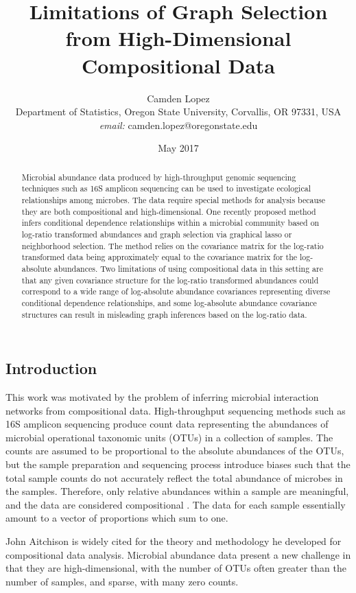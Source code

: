 \documentclass[10pt]{article}
\title{Limitations of Graph Selection from High-Dimensional Compositional Data}
\author{Camden Lopez \\
\small{Department of Statistics, Oregon State University, Corvallis, OR 97331, USA} \\
\small{\textit{email:} camden.lopez@oregonstate.edu}}
\date{May 2017}
\begin{document}
\maketitle

\begin{abstract}
Microbial abundance data produced by high-throughput genomic sequencing techniques such as 16S amplicon sequencing can be used to investigate ecological relationships among microbes. The data require special methods for analysis because they are both compositional and high-dimensional. One recently proposed method infers conditional dependence relationships within a microbial community based on log-ratio transformed abundances and graph selection via graphical lasso or neighborhood selection. The method relies on the covariance matrix for the log-ratio transformed data being approximately equal to the covariance matrix for the log-absolute abundances. Two limitations of using compositional data in this setting are that any given covariance structure for the log-ratio transformed abundances could correspond to a wide range of log-absolute abundance covariances representing diverse conditional dependence relationships, and some log-absolute abundance covariance structures can result in misleading graph inferences based on the log-ratio data.
\end{abstract}

\clearpage
\setcounter{page}{1}

\subsection*{Introduction}

This work was motivated by the problem of inferring microbial interaction networks from compositional data. High-throughput sequencing methods such as 16S amplicon sequencing produce count data representing the abundances of microbial operational taxonomic units (OTUs) in a collection of samples. The counts are assumed to be proportional to the absolute abundances of the OTUs, but the sample preparation and sequencing process introduce biases such that the total sample counts do not accurately reflect the total abundance of microbes in the samples. Therefore, only relative abundances within a sample are meaningful, and the data are considered compositional \cite{gloor,tsilimigras}. The data for each sample essentially amount to a vector of proportions which sum to one.

John Aitchison \citeyear{aitchison} is widely cited for the theory and methodology he developed for compositional data analysis. Microbial abundance data present a new challenge in that they are high-dimensional, with the number of OTUs often greater than the number of samples, and sparse, with many zero counts.
\end{document}
